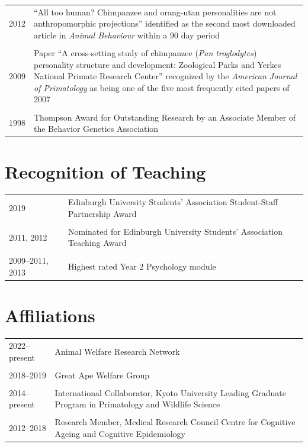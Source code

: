 \documentclass[11pt]{article}
\begin{document}
\begin{tabular}{p{3cm}p{12cm}}
  2012 & ``All too human? Chimpanzee and orang-utan personalities are
         not anthropomorphic projections'' identified as the second most
         downloaded article in \textit{Animal Behaviour} within a 90
         day period \\ \\

  2009 & Paper ``A cross-setting study of chimpanzee (\textit{Pan
         troglodytes}) personality structure and development: Zoological
         Parks and Yerkes National Primate Research Center'' recognized by the
         \textit{American Journal of Primatology} as being one of the five most
         frequently cited papers of 2007 \\ \\

  1998 & Thompson Award for Outstanding
         Research by an Associate Member of the Behavior Genetics Association
\end{tabular}

\section*{Recognition of Teaching}
\begin{tabular}{p{3cm}p{12cm}}
  2019 & Edinburgh University Students' Association Student-Staff
         Partnership Award \\ \\

  2011, 2012 & Nominated for Edinburgh University Students' Association
               Teaching Award \\ \\

  2009--2011, 2013 & Highest rated Year 2 Psychology module 
\end{tabular}

\section*{Affiliations}
\begin{tabular}{p{3cm}p{12cm}}
  2022--present & Animal Welfare Research Network \\ \\

  2018--2019 & Great Ape Welfare Group \\ \\

  2014--present & International Collaborator, Kyoto University Leading Graduate Program in
                  Primatology and Wildlife Science \\ \\

  2012--2018 & Research Member, Medical Research Council Centre for
               Cognitive Ageing and Cognitive Epidemiology
\end{tabular}
\end{document}
